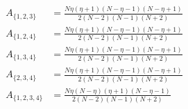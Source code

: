\documentclass[11pt]{article}
\begin{document}
\begin{align*}
  A_{\{1,2,3\}} &= \frac{N \eta \left(\eta + 1\right) \left(N - \eta - 1\right) \left(N - \eta + 1\right)}{2 \left(N - 2\right) \left(N - 1\right) \left(N + 2\right)} \\
  A_{\{1,2,4\}} &= \frac{N \eta \left(\eta + 1\right) \left(N - \eta - 1\right) \left(N - \eta + 1\right)}{2 \left(N - 2\right) \left(N - 1\right) \left(N + 2\right)} \\
  A_{\{1,3,4\}} &= \frac{N \eta \left(\eta + 1\right) \left(N - \eta - 1\right) \left(N - \eta + 1\right)}{2 \left(N - 2\right) \left(N - 1\right) \left(N + 2\right)} \\
  A_{\{2,3,4\}} &= \frac{N \eta \left(\eta + 1\right) \left(N - \eta - 1\right) \left(N - \eta + 1\right)}{2 \left(N - 2\right) \left(N - 1\right) \left(N + 2\right)} \\
  A_{\{1,2,3,4\}} &= \frac{N \eta \left(N - \eta\right) \left(\eta + 1\right) \left(N - \eta - 1\right)}{2 \left(N - 2\right) \left(N - 1\right) \left(N + 2\right)} 
\end{align*}
\end{document}

